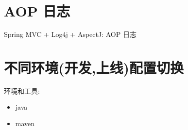 \section{AOP 日志}\label{aop-ux65e5ux5fd7}

Spring MVC + Log4j + AspectJ: AOP 日志

\section{不同环境(开发,上线)配置切换}\label{ux4e0dux540cux73afux5883ux5f00ux53d1ux4e0aux7ebfux914dux7f6eux5207ux6362}

环境和工具:

\begin{itemize}
\tightlist
\item
  java
\item
  maven
\end{itemize}
